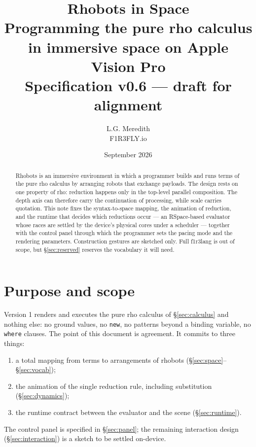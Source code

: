 \documentclass[11pt]{article}
\title{\textbf{Rhobots in Space}\\[1mm]
\large Programming the pure rho calculus in immersive space on Apple Vision Pro\\[1mm]
\normalsize Specification v0.6 --- draft for alignment}
\author{L.G. Meredith\\ \small F1R3FLY.io}
\date{September 2026}
\begin{document}
\maketitle

\begin{abstract}
\noindent
Rhobots is an immersive environment in which a programmer builds and runs terms of the
pure rho calculus by arranging robots that exchange payloads. The design rests on one
property of rho: reduction happens only in the top-level parallel composition. The depth
axis can therefore carry the continuation of processing, while scale carries quotation.
This note fixes the syntax-to-space mapping, the animation of reduction, and the runtime
that decides which reductions occur --- an RSpace-based evaluator whose races are settled
by the device's physical cores under a scheduler --- together with the control panel through which the programmer sets the pacing mode and the rendering parameters. Construction gestures are sketched only.
Full f1r3lang is out of scope, but \S\ref{sec:reserved} reserves the vocabulary it will need.
\end{abstract}

\tableofcontents
\listoffigures

\section{Purpose and scope}

Version 1 renders and executes the pure rho calculus of \S\ref{sec:calculus} and nothing
else: no ground values, no \texttt{new}, no patterns beyond a binding variable, no
\texttt{where} clauses. The point of this document is agreement. It commits to three things:
\begin{enumerate}
  \item a total mapping from terms to arrangements of rhobots (\S\ref{sec:space}--\S\ref{sec:vocab});
  \item the animation of the single reduction rule, including substitution (\S\ref{sec:dynamics});
  \item the runtime contract between the evaluator and the scene (\S\ref{sec:runtime}).
\end{enumerate}
The control panel is specified in \S\ref{sec:panel}; the remaining interaction design (\S\ref{sec:interaction}) is a sketch to be settled on-device.

\end{document}

